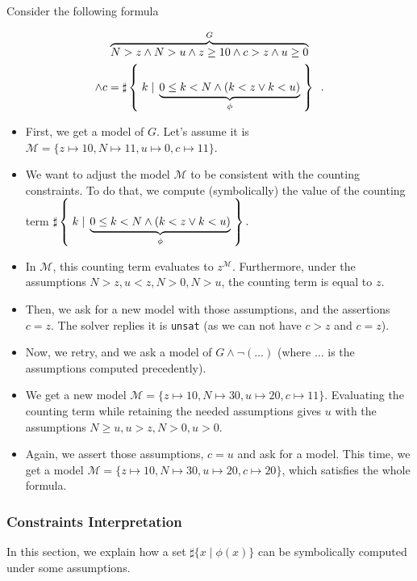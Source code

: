 \newpage
\begin{example}

Consider the following formula

\begin{multline*}
\overbrace{N > z \land N > u \land z \ge 10 \land c > z \land u \ge 0}^G \\
\land c = \sharp\left\lbrace\;k\;|\;\underbrace{0 \le k < N \land (k < z \lor k < u)}_\phi\;\right\rbrace\enspace.
\end{multline*}

\begin{itemize}
\item First, we get a model of $G$. Let's assume it is $\mathcal{M} = \{ z \mapsto 10, N \mapsto 11, u \mapsto 0, c \mapsto 11\}$.
\item We want to adjust the model $\mathcal{M}$ to be consistent with the
counting constraints. To do that, we compute (symbolically) the value of the
counting term $\sharp\left\lbrace\;k\;|\;\underbrace{0 \le k < N \land (k < z \lor k < u)}_\phi\;\right\rbrace.$
\item In $\mathcal{M}$, this counting term evaluates to $z^\mathcal{M}$. Furthermore, under the assumptions $N > z, u < z, N > 0, N > u$, the counting term is equal to $z$.
\item Then, we ask for a new model with those assumptions, and the assertions $c = z$. The solver replies it is \texttt{unsat} (as we can not have $c > z$ and $c = z$).
\item Now, we retry, and we ask a model of $G \land \lnot (\ldots)$ (where $\ldots$ is the assumptions computed precedently).
\item We get a new model $\mathcal{M} = \{ z \mapsto 10, N \mapsto 30, u \mapsto
20, c \mapsto 11\}$. Evaluating the counting term while retaining the needed
assumptions gives $u$ with the assumptions $N \ge u, u > z, N > 0, u > 0$.
\item Again, we assert those assumptions, $c = u$ and ask for a model. This
time, we get a model $\mathcal{M} = \{ z \mapsto 10, N \mapsto 30, u \mapsto 20,
c \mapsto 20\}$, which satisfies the whole formula.
\end{itemize}

\end{example}

\subsubsection{Constraints Interpretation}

In this section, we explain how a set $\sharp\{x\mid\phi(x)\}$ can be
symbolically computed under some assumptions.

